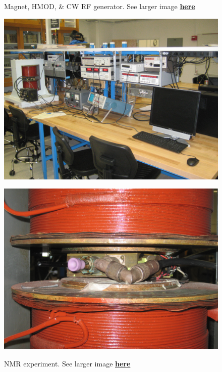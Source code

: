 \documentclass{../lab}
\begin{document}
\begin{figure}[h]
\begin{minipage}{0.32\textwidth}
    \caption{Magnet, HMOD, & CW RF generator. See larger image \href{http://experimentationlab.berkeley.edu/sites/default/files/images/NMR_Exp_3557.jpg}{\textbf{here}}}
\end{minipage}
\begin{minipage}{0.32\textwidth}
    \href{http://experimentationlab.berkeley.edu/sites/default/files/images/NMR_Exp_3559.jpg}{\includegraphics[width=\linewidth,keepaspectratio]{images/NMR_Exp_3559.jpg}}
    \caption{NMR experiment. See larger image \href{http://experimentationlab.berkeley.edu/sites/default/files/images/NMR_Exp_3559.jpg}{\textbf{here}}}
\end{minipage}
\begin{minipage}{0.32\textwidth}
    \href{http://experimentationlab.berkeley.edu/sites/default/files/images/NMR_Head-in-Magnet_3560.jpg}{\includegraphics[width=\linewidth,keepaspectratio]{images/NMR_Head-in-Magnet_3560.jpg}}

\end{minipage}
\end{figure}
\end{document}
